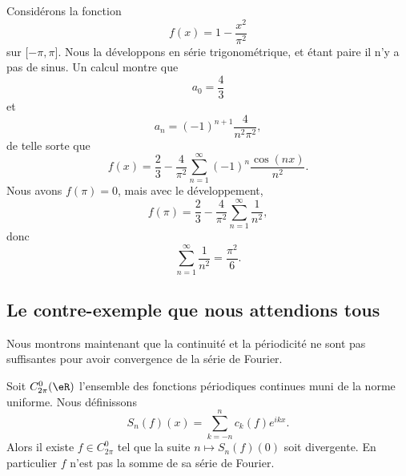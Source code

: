 \begin{example}
	Considérons la fonction
	\begin{equation}
		f(x)=1-\frac{ x^2 }{ \pi^2 }
	\end{equation}
	sur \( \mathopen[ -\pi , \pi \mathclose]\). Nous la développons en série trigonométrique, et étant paire il n'y a pas de sinus. Un calcul montre que
	\begin{equation}
		a_0=\frac{ 4 }{ 3 }
	\end{equation}
	et
	\begin{equation}
		a_n=(-1)^{n+1}\frac{ 4 }{ n^2\pi^2 },
	\end{equation}
	de telle sorte que
	\begin{equation}
		f(x)=\frac{ 2 }{ 3 }-\frac{ 4 }{ \pi^2 }\sum_{n=1}^{\infty}(-1)^n\frac{ \cos(nx) }{ n^2 }.
	\end{equation}
	Nous avons \( f(\pi)=0\), mais avec le développement,
	\begin{equation}
		f(\pi)=\frac{ 2 }{ 3 }-\frac{ 4 }{ \pi^2 }\sum_{n=1}^{\infty}\frac{1}{ n^2 },
	\end{equation}
	donc
	\begin{equation}
		\sum_{n=1}^{\infty}\frac{1}{ n^2 }=\frac{ \pi^2 }{ 6 }.
	\end{equation}
\end{example}

\subsection{Le contre-exemple que nous attendions tous}

Nous montrons maintenant que la continuité et la périodicité ne sont pas suffisantes pour avoir convergence de la série de Fourier.

\begin{proposition} \label{PropREkHdol}
	Soit \( C^0_{2\pi}(\eR)\) l'ensemble des fonctions périodiques continues muni de la norme uniforme. Nous définissons
	\begin{equation}
		S_n(f)(x)=\sum_{k=-n}^nc_k(f) e^{ikx}.
	\end{equation}
	Alors il existe \( f\in C^0_{2\pi}\) tel que la suite \(n\mapsto S_n(f)(0)\) soit divergente. En particulier \( f\) n'est pas la somme de sa série de Fourier.
\end{proposition}

